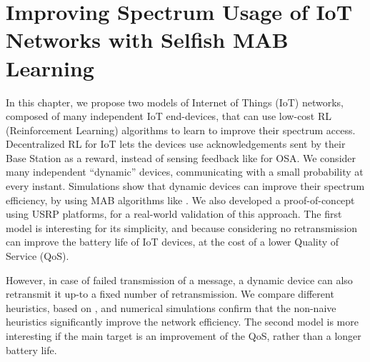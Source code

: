 
\chapter{Improving Spectrum Usage of IoT Networks with Selfish MAB Learning}
\label{chapter:4}

\graphicspath{{2-Chapters/4-Chapter/Images/}}


\abstractStartChapter{}%
%
In this chapter, we propose two models of Internet of Things (IoT) networks, composed of many independent IoT end-devices,
that can use low-cost RL (Reinforcement Learning) algorithms to learn to improve their spectrum access.
%
Decentralized RL for IoT lets the devices use acknowledgements sent by their Base Station as a reward, instead of sensing feedback like for OSA.
We consider many independent ``dynamic'' devices, communicating with a small probability at every instant.
Simulations show that dynamic devices can improve their spectrum efficiency,
by using MAB algorithms like \UCB.
We also developed a proof-of-concept using USRP platforms, for a real-world validation of this approach.
%
The first model
is interesting for its simplicity,
and because considering no retransmission can improve the battery life of IoT devices, at the cost of a lower Quality of Service (QoS).

However, in case of failed transmission of a message, a dynamic device can also retransmit it up-to a fixed number of retransmission.
We compare different heuristics, based on \UCB, and numerical simulations confirm that the non-naive heuristics significantly improve the network efficiency.
%
The second model is more interesting if the main target is an improvement of the QoS, rather than a longer battery life.

\minitocStartChapter{}


